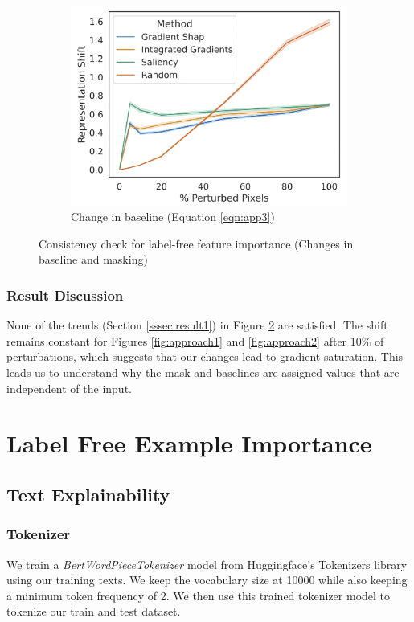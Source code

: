 \begin{figure}[h]
\begin{subfigure}[b]{0.32\linewidth}
\includegraphics[width=\textwidth]{images/feature_imp/approach3.png} 
\caption{Change in baseline (Equation \ref{eqn:app3})}\label{fig:approach3}
\end{subfigure}
\caption{Consistency check for label-free feature importance (Changes in baseline and masking)}\label{fig:featapproaches}
\end{figure}


\subsubsection{Result Discussion}
None of the trends (Section \ref{sssec:result1}) in Figure \ref{fig:featapproaches} are satisfied. The shift remains constant for Figures \ref{fig:approach1} and \ref{fig:approach2} after 10\% of perturbations, which suggests that our changes lead to gradient saturation. This leads us to understand why the mask and baselines are assigned values that are independent of the input.


\section{Label Free Example Importance} 
\subsection{Text Explainability}
\label{appendix:textexplain}

\subsubsection{Tokenizer}
\label{sssec:tokenizer_model}
We train a \emph{BertWordPieceTokenizer} model from Huggingface's Tokenizers \citep{tokenizers:online} library using our training texts. We keep the vocabulary size at 10000 while also keeping a minimum token frequency of 2. We then use this trained tokenizer model to tokenize our train and test dataset.

